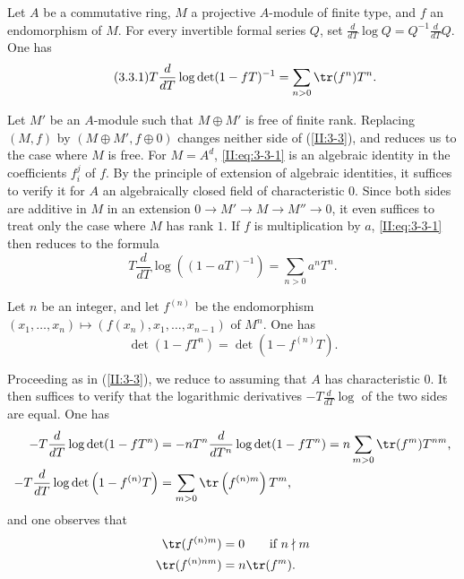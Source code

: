 \begin{proposition_}\label{II:3-3}
Let $A$ be a commutative ring, $M$ a projective $A$-module of finite type,
and $f$ an endomorphism of $M$. For every invertible formal series $Q$, set
$\frac{d}{dT}\log Q = Q^{-1}\frac{d}{dT}Q$. One has
\begin{equation*}\tag{3.3.1}\label{II:eq:3-3-1}
  T\frac{d}{dT}\log\det(1-f T)^{-1} = \sum_{n>0} \tr(f^n) T^n \text{.}
\end{equation*}
\end{proposition_}

Let $M'$ be an $A$-module such that $M\oplus M'$ is free of finite rank.
Replacing $(M,f)$ by $(M\oplus M',f\oplus 0)$ changes neither side of
(\ref{II:3-3}), and reduces us to the case where $M$ is free. For $M=A^d$,
\eqref{II:eq:3-3-1} is an algebraic identity in the coefficients $f_i^j$ of
$f$. By the principle of extension of algebraic identities, it suffices to
verify it for $A$ an algebraically closed field of characteristic $0$. Since
both sides are additive in $M$ in an extension
$0\to M'\to M\to M''\to 0$, it even suffices to treat only the case where
$M$ has rank $1$. If $f$ is multiplication by $a$,
\eqref{II:eq:3-3-1} then reduces to the formula
\[
  T\frac{d}{dT}\log\left((1-a T)^{-1}\right) = \sum_{n>0} a^n T^n \text{.}
\]






\begin{corollary_}\label{II:3-4}
Let $n$ be an integer, and let $f^{(n)}$ be the endomorphism
$(x_1,\dotsc,x_n)\mapsto \left(f(x_n),x_1,\dotsc,x_{n-1}\right)$ of $M^n$.
One has
\begin{equation*}\tag{3.4.1}\label{II:eq:3-4-1}
  \det(1-f T^n) = \det(1-f^{(n)} T) \text{.}
\end{equation*}
\end{corollary_}

Proceeding as in (\ref{II:3-3}), we reduce to assuming that $A$ has
characteristic $0$. It then suffices to verify that the logarithmic
derivatives $-T\frac{d}{dT}\log$ of the two sides are equal. One has
\begin{align*}
  -T\frac{d}{dT}\log\det(1-f T^n) &= - n T^n \frac{d}{dT^n} \log\det(1-f T^n) = n \sum_{m>0} \tr(f^m) T^{n m} \text{,} \\
  -T \frac{d}{dT}\log\det\left(1-f^{(n)} T\right) &= \sum_{m>0} \tr\left(f^{(n) m}\right) T^m \text{,}
\end{align*}
and one observes that
\begin{align*}
  \tr(f^{(n) m}) &= 0 \qquad \text{if $n\nmid m$} \\
  \tr(f^{(n) n m}) &= n \tr(f^m) \text{.}
\end{align*}






